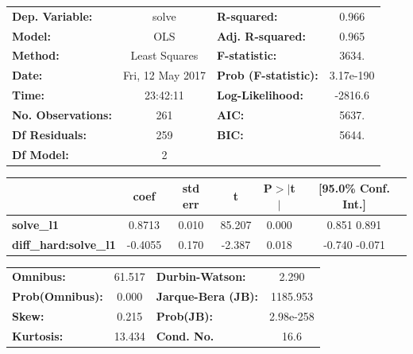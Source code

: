 \documentclass{article}
\begin{document}
\begin{center}
\begin{tabular}{lclc}
\toprule
\textbf{Dep. Variable:}     &      solve       & \textbf{  R-squared:         } &     0.966   \\
\textbf{Model:}             &       OLS        & \textbf{  Adj. R-squared:    } &     0.965   \\
\textbf{Method:}            &  Least Squares   & \textbf{  F-statistic:       } &     3634.   \\
\textbf{Date:}              & Fri, 12 May 2017 & \textbf{  Prob (F-statistic):} & 3.17e-190   \\
\textbf{Time:}              &     23:42:11     & \textbf{  Log-Likelihood:    } &   -2816.6   \\
\textbf{No. Observations:}  &         261      & \textbf{  AIC:               } &     5637.   \\
\textbf{Df Residuals:}      &         259      & \textbf{  BIC:               } &     5644.   \\
\textbf{Df Model:}          &           2      & \textbf{                     } &             \\
\bottomrule
\end{tabular}
\begin{tabular}{lccccc}
                            & \textbf{coef} & \textbf{std err} & \textbf{t} & \textbf{P$>$$|$t$|$} & \textbf{[95.0\% Conf. Int.]}  \\
\midrule
\textbf{solve\_l1}           &       0.8713  &        0.010     &    85.207  &         0.000        &         0.851     0.891       \\
\textbf{diff\_hard:solve\_l1} &      -0.4055  &        0.170     &    -2.387  &         0.018        &        -0.740    -0.071       \\
\bottomrule
\end{tabular}
\begin{tabular}{lclc}
\textbf{Omnibus:}       & 61.517 & \textbf{  Durbin-Watson:     } &     2.290  \\
\textbf{Prob(Omnibus):} &  0.000 & \textbf{  Jarque-Bera (JB):  } &  1185.953  \\
\textbf{Skew:}          &  0.215 & \textbf{  Prob(JB):          } & 2.98e-258  \\
\textbf{Kurtosis:}      & 13.434 & \textbf{  Cond. No.          } &      16.6  \\
\bottomrule
\end{tabular}
\end{center}
\end{document}
